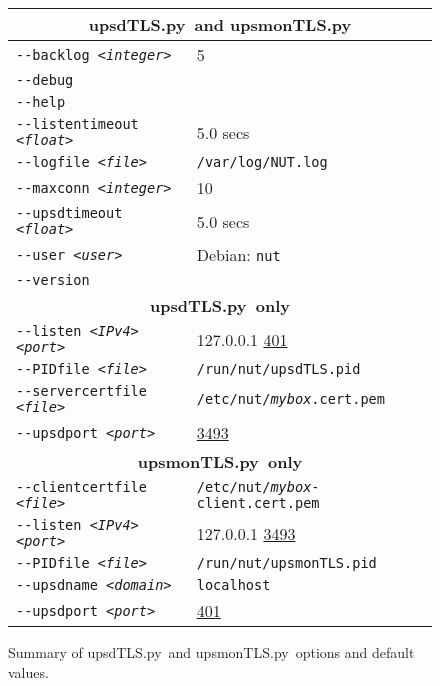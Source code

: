 \documentclass[12pt]{article}
\newcommand{\upsdTLS}{\mbox{\textcolor{UPSDCOLOUR}{upsdTLS.py}}}
\newcommand{\upsmonTLS}{\mbox{\textcolor{UPSMONCOLOUR}{upsmonTLS.py}}}
\newcommand{\IANAnut}{\href{https://www.iana.org/assignments/service-names-port-numbers/service-names-port-numbers.xhtml?search=3493}%
                           {3493}}
\newcommand{\IANAups}{\href{https://www.iana.org/assignments/service-names-port-numbers/service-names-port-numbers.xhtml?search=401}%
                           {401}}
\begin{document}
\begin{figure}[ht]
\begin{center}
\begin{tabular}{|l|l|}
\hline
\multicolumn{2}{|c|}{\textbf{\upsdTLS\ and \upsmonTLS}} \\ \hline\hline
\texttt{-\/-backlog \textit{<integer>}}           & 5  \\ \hline
\texttt{-\/-debug}                                &    \\ \hline
\texttt{-\/-help}                                 &    \\ \hline
\texttt{-\/-listentimeout \textit{<float>}}       & 5.0 secs   \\ \hline
\texttt{-\/-logfile \textit{<file>}}              & \texttt{/var/log/NUT.log}  \\ \hline
\texttt{-\/-maxconn \textit{<integer>}}           & 10  \\ \hline
\texttt{-\/-upsdtimeout \textit{<float>}}         & 5.0 secs   \\ \hline
\texttt{-\/-user \textit{<user>}}                 & Debian: \texttt{nut}   \\ \hline
\texttt{-\/-version}                              & \\ \hline\hline

\multicolumn{2}{|c|}{\textbf{\upsdTLS\ only}}     \\ \hline\hline
\texttt{-\/-listen \textit{<IPv4> <port>}}        & 127.0.0.1 \IANAups  \\ \hline
\texttt{-\/-PIDfile \textit{<file>}}              & \texttt{/run/nut/upsdTLS.pid}  \\ \hline
\texttt{-\/-servercertfile \textit{<file>}}       & \texttt{/etc/nut/\textit{mybox}.cert.pem}  \\ \hline
\texttt{-\/-upsdport \textit{<port>}}             & \IANAnut\  \\ \hline\hline

\multicolumn{2}{|c|}{\textbf{\upsmonTLS\ only}}   \\ \hline\hline
\texttt{-\/-clientcertfile \textit{<file>}}       & \texttt{/etc/nut/\textit{mybox}-client.cert.pem}  \\ \hline
\texttt{-\/-listen \textit{<IPv4> <port>}}        & 127.0.0.1 \IANAnut  \\ \hline
\texttt{-\/-PIDfile \textit{<file>}}              & \texttt{/run/nut/upsmonTLS.pid}  \\ \hline
\texttt{-\/-upsdname \textit{<domain>}}           & \texttt{localhost} \\ \hline
\texttt{-\/-upsdport \textit{<port>}}             & \IANAups\  \\ \hline

\end{tabular}
\caption{Summary of \upsdTLS\ and \upsmonTLS\ options and default values.\label{fig:shimsummary}}
\end{center}
\end{figure}
\end{document}
